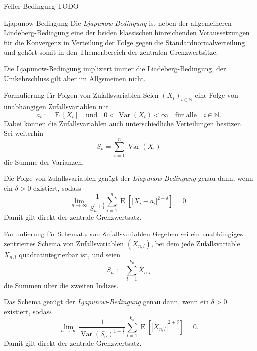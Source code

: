\begin{defi}{Feller-Bedingung}
    TODO
\end{defi}

\begin{defi}{Ljapunow-Bedingung}
    Die \emph{Ljapunow-Bedingung}  ist neben der allgemeineren Lindeberg-Bedingung eine der beiden klassischen hinreichenden Voraussetzungen für die Konvergenz in Verteilung der Folge gegen die Standardnormalverteilung und gehört somit in den Themenbereich der zentralen Grenzwertsätze.

    Die Ljapunow-Bedingung impliziert immer die Lindeberg-Bedingung, der Umkehrschluss gilt aber im Allgemeinen nicht.
\end{defi}

\begin{defi}{Formulierung für Folgen von Zufallsvariablen}
    Seien $(X_i)_{i \in \mathbb{N}}$ eine Folge von unabhängigen Zufallsvariablen mit
    \[
        a_i := \operatorname{E} [X_i] \quad \text{und} \quad 0 < \operatorname{Var} (X_i) < \infty \quad \text{für alle} \quad i \in \mathbb{N}.
    \]
    Dabei können die Zufallsvariablen auch unterschiedliche Verteilungen besitzen.
    Sei weiterhin
    \[
        S_n = \sum_{i=1}^{n} \operatorname{Var} (X_i)
    \]
    die Summe der Varianzen.

    Die Folge von Zufallsvariablen genügt der \emph{Ljapunow-Bedingung} genau dann, wenn ein $\delta > 0$ existiert, sodass
    \[
        \lim_{n \to \infty} \frac{1}{S_n^{1 + \frac{\delta}{2}}} \sum_{i=1}^{n} \operatorname{E} \left[ |X_i - a_i|^{2 + \delta} \right] = 0.
    \]
    Damit gilt direkt der zentrale Grenzwertsatz.
\end{defi}

\begin{defi}{Formulierung für Schemata von Zufallsvariablen}
    Gegeben sei ein unabhängiges zentriertes Schema von Zufallsvariablen $(X_{n,l})$, bei dem jede Zufallsvariable $X_{n,l}$ quadratintegrierbar ist, und seien
    \[
        S_n := \sum_{l=1}^{k_n} X_{n,l}
    \]
    die Summen über die zweiten Indizes.

    Das Schema genügt der \emph{Ljapunow-Bedingung} genau dann, wenn ein $\delta > 0$ existiert, sodass
    \[
        \lim_{n \to \infty} \frac{1}{\operatorname{Var}(S_n)^{1 + \frac{\delta}{2}}} \sum_{l=1}^{k_n} \operatorname{E} \left[ |X_{n,l}|^{2 + \delta} \right] = 0.
    \]
    Damit gilt direkt der zentrale Grenzwertsatz.
\end{defi}
